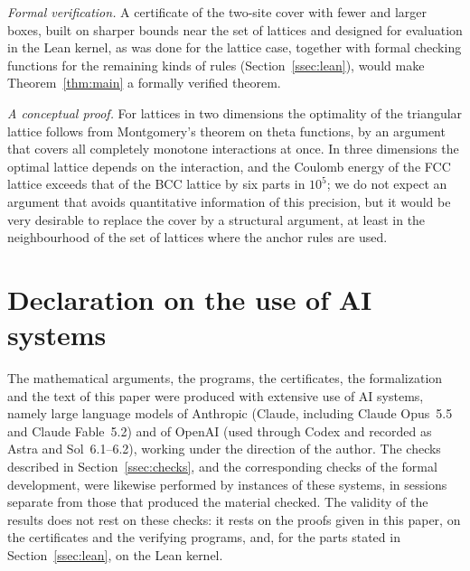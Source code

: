 \emph{Formal verification.} A certificate of the two-site cover with fewer and larger boxes, built on sharper bounds near the
set of lattices and designed for evaluation in the Lean kernel, as was done for the lattice case, together with formal checking
functions for the remaining kinds of rules (Section~\ref{ssec:lean}), would make Theorem~\ref{thm:main} a formally verified
theorem.

\emph{A conceptual proof.} For lattices in two dimensions the optimality of the triangular lattice follows from Montgomery's theorem
on theta functions, by an argument that covers all completely monotone interactions at once. In three dimensions the optimal
lattice depends on the interaction, and the Coulomb energy of the FCC lattice exceeds that of the BCC lattice by six parts in
$10^5$; we do not expect an argument that avoids quantitative information of this precision, but it would be very desirable to
replace the cover by a structural argument, at least in the neighbourhood of the set of lattices where the anchor rules are used.

\section*{Declaration on the use of AI systems}
The mathematical arguments, the programs, the certificates, the formalization and the text of this paper were produced with
extensive use of AI systems, namely large language models of Anthropic (Claude, including Claude Opus~5.5 and Claude Fable~5.2) and
of OpenAI (used through Codex and recorded as Astra and Sol~6.1--6.2), working under the direction of the author. The checks
described in Section~\ref{ssec:checks}, and the corresponding checks of the formal development, were likewise performed by
instances of these systems, in sessions separate from those that produced the material checked. The validity of the results does not rest on these checks: it
rests on the proofs given in this paper, on the certificates and the verifying programs, and, for the parts stated in
Section~\ref{ssec:lean}, on the Lean kernel.
